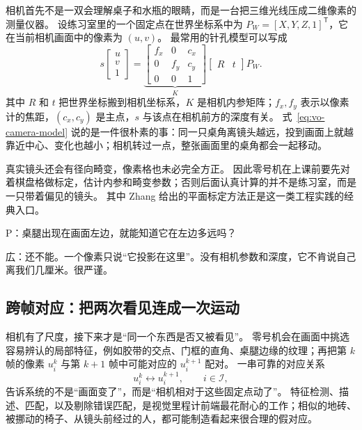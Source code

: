 相机首先不是一双会理解桌子和水瓶的眼睛，而是一台把三维光线压成二维像素的测量仪器。
设练习室里的一个固定点在世界坐标系中为 $P_W=[X,Y,Z,1]^{\mathsf T}$，它在当前相机画面中的像素为 $(u,v)$。
最常用的针孔模型可以写成
\begin{equation}
s
\left[
\begin{array}{c}
u\\v\\1
\end{array}
\right]
=
\underbrace{
\left[
\begin{array}{ccc}
f_x & 0 & c_x\\
0 & f_y & c_y\\
0 & 0 & 1
\end{array}
\right]}_{K}
\left[
\begin{array}{cc}
R & t
\end{array}
\right]
P_W.
\label{eq:vo-camera-model}
\end{equation}
其中 $R$ 和 $t$ 把世界坐标搬到相机坐标系，$K$ 是相机内参矩阵；$f_x,f_y$ 表示以像素计的焦距，$(c_x,c_y)$ 是主点，$s$ 与该点在相机前方的深度有关。
式~\ref{eq:vo-camera-model} 说的是一件很朴素的事：同一只桌角离镜头越远，投到画面上就越靠近中心、变化也越小；相机转过一点，整张画面里的桌角都会一起移动。

真实镜头还会有径向畸变，像素格也未必完全方正。
因此零号机在上课前要先对着棋盘格做标定，估计内参和畸变参数；否则后面认真计算的并不是练习室，而是一只带着偏见的镜头。
其中 Zhang 给出的平面标定方法正是这一类工程实践的经典入口\cite{zhang2000calib}。

P：桌腿出现在画面左边，就能知道它在左边多远吗？

広：还不能。一个像素只说“它投影在这里”。没有相机参数和深度，它不肯说自己离我们几厘米。很严谨。

\subsection{跨帧对应：把两次看见连成一次运动}

相机有了尺度，接下来才是“同一个东西是否又被看见”。
零号机会在画面中挑选容易辨认的局部特征，例如胶带的交点、门框的直角、桌腿边缘的纹理；再把第 $k$ 帧的像素 $u_i^k$ 与第 $k+1$ 帧中可能对应的 $u_i^{k+1}$ 配对。
一串可靠的对应关系
\begin{equation}
u_i^k \longleftrightarrow u_i^{k+1}, \qquad i\in\mathcal I,
\end{equation}
告诉系统的不是“画面变了”，而是“相机相对于这些固定点动了”。
特征检测、描述、匹配，以及剔除错误匹配，是视觉里程计前端最花耐心的工作；相似的地砖、被挪动的椅子、从镜头前经过的人，都可能制造看起来很合理的假对应\cite{fraundorfer2012vo}。

